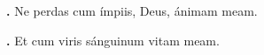 \textbf{\Vbar.} Ne perdas cum ímpiis, Deus, ánimam meam.

\textbf{\Rbar.} Et cum viris sánguinum vitam meam.

